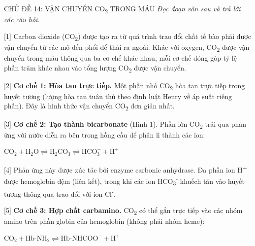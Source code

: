\documentclass[12pt,a4paper,twoside]{article}
\newenvironment{readingpassage}[1][]{%
    \begin{tcolorbox}[enhanced, colback=grayLight, colframe=secondaryBlue,
        coltitle=textDark, fonttitle=\bfseries, title={#1},
        rounded corners, arc=3mm, boxrule=1pt,
        left=15pt, right=15pt, top=10pt, bottom=10pt,
        breakable, before skip=10pt, after skip=10pt, drop fuzzy shadow]
    \setstretch{1.3}
}{\end{tcolorbox}}
\begin{document}
\label{b1_cd14}
\begin{topicbox}{\large CHỦ ĐỀ 14: VẬN CHUYỂN CO\textsubscript{2} TRONG MÁU}
\vspace{8pt}
\textit{Đọc đoạn văn sau và trả lời các câu hỏi.}
\end{topicbox}
\vspace{5pt}
\begin{readingpassage}[]


[1] Carbon dioxide (CO\textsubscript{2}) được tạo ra từ quá trình trao đổi chất tế bào phải được vận chuyển từ các mô đến phổi để thải ra ngoài. Khác với oxygen, CO\textsubscript{2} được vận chuyển trong máu thông qua ba cơ chế khác nhau, mỗi cơ chế đóng góp tỷ lệ phần trăm khác nhau vào tổng lượng CO\textsubscript{2} được vận chuyển.

[2] \textbf{Cơ chế 1: Hòa tan trực tiếp.} Một phần nhỏ CO\textsubscript{2} hòa tan trực tiếp trong huyết tương (lượng hòa tan tuân thủ theo định luật Henry về áp suất riêng phần). Đây là hình thức vận chuyển CO\textsubscript{2} đơn giản nhất.

[3] \textbf{Cơ chế 2: Tạo thành bicarbonate} (Hình 1). Phần lớn CO\textsubscript{2} trải qua phản ứng với nước diễn ra bên trong hồng cầu để phân li thành các ion:

\vspace{2pt}
\begin{center}
$\text{CO}_2 + \text{H}_2\text{O} \rightleftharpoons \text{H}_2\text{CO}_3 \rightleftharpoons \text{HCO}_3^- + \text{H}^+$
\end{center}
\vspace{2pt}

[4] Phản ứng này được xúc tác bởi enzyme carbonic anhydrase. Đa phần ion H\textsuperscript{+} được hemoglobin đệm (liên kết), trong khi các ion HCO\textsubscript{3}\textsuperscript{-} khuếch tán vào huyết tương thông qua trao đổi với ion Cl\textsuperscript{-}.

[5] \textbf{Cơ chế 3: Hợp chất carbamino.} CO\textsubscript{2} có thể gắn trực tiếp vào các nhóm amino trên phần globin của hemoglobin (không phải nhóm heme):

\vspace{2pt}
\begin{center}
$\text{CO}_2 + \text{Hb-NH}_2 \rightleftharpoons \text{Hb-NHCOO}^- + \text{H}^+$
\end{center}
\vspace{2pt}


\end{readingpassage}
\end{document}
